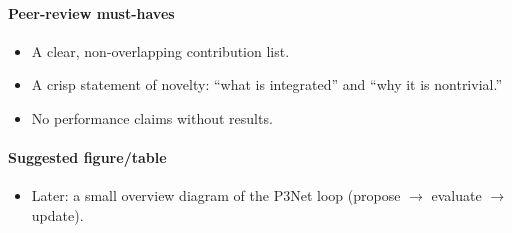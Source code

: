 \paragraph{Peer-review must-haves}
\begin{itemize}
  \item A clear, non-overlapping contribution list.
  \item A crisp statement of novelty: “what is integrated” and “why it is nontrivial.”
  \item No performance claims without results.
\end{itemize}

\paragraph{Suggested figure/table}
\begin{itemize}
  \item Later: a small overview diagram of the P3Net loop (propose $\rightarrow$ evaluate $\rightarrow$ update).
\end{itemize}
